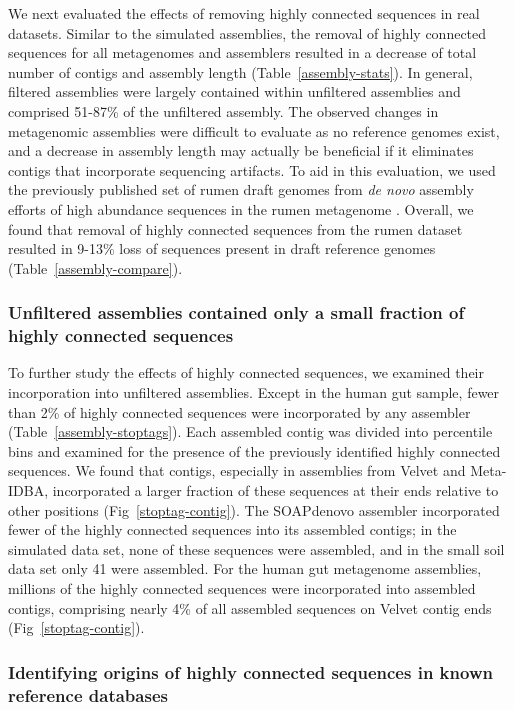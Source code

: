 \documentclass[10pt]{article}
\begin{document}
We next evaluated the effects of removing highly connected sequences in
real datasets.  Similar to the simulated assemblies, the
removal of highly connected sequences for all metagenomes and
assemblers resulted in a decrease of total number of contigs and assembly
length (Table~\ref{assembly-stats}).  In general, filtered assemblies were largely
contained within unfiltered assemblies and comprised 51-87\% of the
unfiltered assembly.  The observed changes in metagenomic assemblies
were difficult to evaluate as no reference genomes exist, 
and a decrease in assembly length may actually be beneficial if it
eliminates contigs that incorporate sequencing artifacts.
To aid in this evaluation, we used the previously published set of
rumen draft genomes from \emph{de novo} assembly efforts of high
abundance sequences in the rumen metagenome \cite{Hess:2011p686}.
Overall, we found that removal of highly connected sequences from the
rumen dataset resulted in 9-13\% loss of sequences present in
draft reference genomes (Table~\ref{assembly-compare}).

\subsubsection*{Unfiltered assemblies contained only a small fraction of highly connected sequences}

To further study the effects of highly connected sequences, we
examined their incorporation into unfiltered assemblies.  Except in
the human gut sample, fewer than 2\% of highly connected sequences
were incorporated by any assembler (Table~\ref{assembly-stoptags}).  Each assembled
contig was divided into percentile bins and examined for the
presence of the previously identified highly connected sequences.  We
found that contigs, especially in assemblies from Velvet and
Meta-IDBA, incorporated a larger fraction of these sequences at their
ends relative to other positions (Fig~\ref{stoptag-contig}).  The SOAPdenovo
assembler incorporated fewer of the highly connected sequences into
its assembled contigs; in the simulated data set, none of these sequences
were assembled, and in the small soil data set only 41 were assembled.  For
the human gut metagenome assemblies, millions of the highly connected
sequences were incorporated into assembled contigs, comprising nearly
4\% of all assembled sequences on Velvet contig ends (Fig~\ref{stoptag-contig}).

\subsubsection*{Identifying origins of highly connected sequences in known reference databases}
\end{document}
